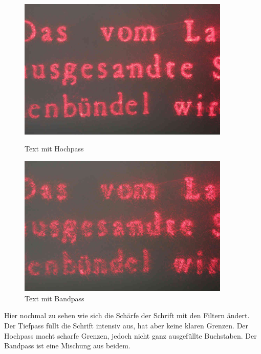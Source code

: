             \begin{figure}[H]
                  \begin{minipage}{0.45\textwidth}
                   \centering
                    \includegraphics[width=0.9\textwidth]{Abb/Abb_15.JPG}
                    \caption{Text mit Hochpass}
                  \end{minipage}\hfill
                  \begin{minipage}{0.45\textwidth}
                   \centering
                    \includegraphics[width=0.9\textwidth]{Abb/Abb_16.JPG}
                    \caption{Text mit Bandpass}
                  \end{minipage}
            \end{figure}

Hier nochmal zu sehen wie sich die Schärfe der Schrift mit den Filtern ändert. Der Tiefpass füllt die Schrift intensiv aus, hat aber keine klaren Grenzen. Der Hochpass macht scharfe Grenzen, jedoch nicht ganz ausgefüllte Buchstaben. Der Bandpass ist eine Mischung aus beidem.

